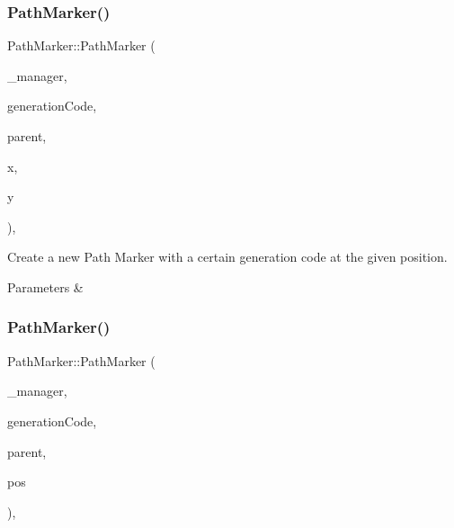 \subsubsection{\texorpdfstring{PathMarker()}{PathMarker()}\hspace{0.1cm}{\footnotesize\ttfamily [2/3]}}
{\footnotesize\ttfamily Path\+Marker\+::\+Path\+Marker (\begin{DoxyParamCaption}\item[{\mbox{\hyperlink{class_game_manager}{Game\+Manager}} $\ast$}]{\+\_\+manager,  }\item[{int}]{generation\+Code,  }\item[{\mbox{\hyperlink{class_game_entity}{Game\+Entity}} $\ast$}]{parent,  }\item[{float}]{x,  }\item[{float}]{y }\end{DoxyParamCaption})\hspace{0.3cm}{\ttfamily [inline]}, {\ttfamily [private]}}



Create a new Path Marker with a certain generation code at the given position. 


\begin{DoxyParams}{Parameters}
{\em } & \\
\hline
\end{DoxyParams}
\mbox{\label{class_path_marker_aad21fc14d9b53cdb06f1c8ed76cc0e07}} 
\subsubsection{\texorpdfstring{PathMarker()}{PathMarker()}\hspace{0.1cm}{\footnotesize\ttfamily [3/3]}}
{\footnotesize\ttfamily Path\+Marker\+::\+Path\+Marker (\begin{DoxyParamCaption}\item[{\mbox{\hyperlink{class_game_manager}{Game\+Manager}} $\ast$}]{\+\_\+manager,  }\item[{int}]{generation\+Code,  }\item[{\mbox{\hyperlink{class_game_entity}{Game\+Entity}} $\ast$}]{parent,  }\item[{\mbox{\hyperlink{classsf_1_1_vector2}{sf\+::\+Vector2f}}}]{pos }\end{DoxyParamCaption})\hspace{0.3cm}{\ttfamily [inline]}, {\ttfamily [private]}}



